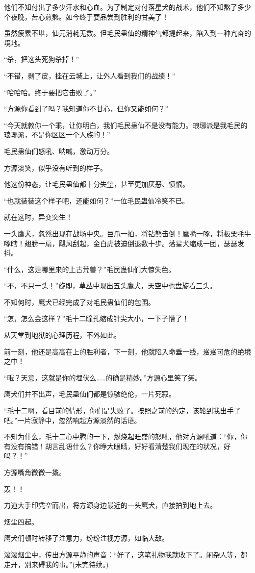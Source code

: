 \begin{this_body}
他们不知付出了多少汗水和心血。为了制定对付落星犬的战术，他们不知熬了多少个夜晚，苦心煎熬。如今终于要品尝到胜利的甘美了！

虽然疲累不堪，仙元消耗无数。但毛民蛊仙的精神气都提起来，陷入到一种亢奋的境地。

“杀，把这头死狗杀掉！”

“不错，剥了皮，挂在云城上，让外人看到我们的战绩！”

“哈哈哈。终于要把它击败了。”

“方源你看到了吗？我知道你不甘心，但你又能如何？”

“今天就教你一个乖，让你明白，我们毛民蛊仙不是没有能力。琅琊派是我毛民的琅琊派，不是你区区一个人族的！”

毛民蛊仙们怒吼、呐喊，激动万分。

方源淡笑，似乎没有听到的样子。

他这份神态，让毛民蛊仙都十分失望，甚至更加厌恶、愤恨。

“也就装装这个样子吧，还能如何？”一位毛民蛊仙冷笑不已。

就在这时，异变突生！

一头鹰犬，忽然出现在战场中央。巨爪一拍，将钻熊击倒！鹰嘴一啄，将板栗牦牛啄瞎！翅膀一扇，飓风刮起，金白虎被迫倒退数十步。落星犬缩成一团，瑟瑟发抖。

“什么，这是哪里来的上古荒兽？”毛民蛊仙们大惊失色。

“不，不只一头！”旋即，草丛中现出五头鹰犬，天空中也盘旋着三头。

不知何时，鹰犬已经完成了对毛民蛊仙们的包围。

“怎，怎么会这样？”毛十二瞳孔缩成针尖大小，一下子懵了！

从天堂到地狱的心理历程，不外如此。

前一刻，他还是高高在上的胜利者，下一刻，他就陷入命垂一线，岌岌可危的绝境之中！

“哦？天意，这就是你的埋伏么……的确是精妙。”方源心里笑了笑。

鹰犬们并不出声，毛民蛊仙们都是惊骇绝伦，一片死寂。

“毛十二啊，看目前的情形，你们是失败了。按照之前的约定，该轮到我出手了吧。”一片寂静中，忽然响起方源淡然的话语。

不知为什么，毛十二心中腾的一下，燃烧起旺盛的怒吼，他对方源吼道：“你，你有没有搞错！胡言乱语什么？你睁大眼睛，好好看清楚我们现在的状况，好吗？！”

方源嘴角微微一撬。

轰！！

力道大手印凭空而出，将方源身边最近的一头鹰犬，直接拍到地上去。

烟尘四起。

鹰犬们顿时转移了注意力，纷纷注视方源，如临大敌。

滚滚烟尘中，传出方源平静的声音：“好了，这笔礼物我就收下了。闲杂人等，都走开，别来碍我的事。”(未完待续。)

\end{this_body}

